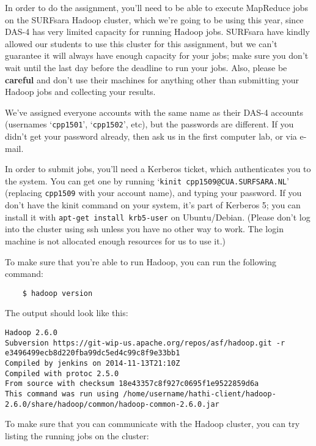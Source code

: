 \documentclass[a4paper,11pt]{article}
\begin{document}
  In order to do the assignment, you'll need to be able to execute MapReduce jobs on the SURFsara Hadoop cluster, which we're going to be using
  this year, since DAS-4 has very limited capacity for running Hadoop jobs. SURFsara have kindly allowed our students to use this cluster for this
  assignment, but we can't guarantee it will always have enough capacity for your jobs; make sure you don't wait until the last day before the
  deadline to run your jobs. Also, please be \textbf{careful} and don't use their machines for anything other than submitting your Hadoop jobs
  and collecting your results.

  We've assigned everyone accounts with the same name as their DAS-4 accounts (usernames `\texttt{cpp1501}', `\texttt{cpp1502}', etc), but the passwords
  are different. If you didn't get your password already, then ask us in the first computer lab, or via e-mail.

  In order to submit jobs, you'll need a Kerberos ticket, which authenticates you to the system. You can get one by running
  `\texttt{kinit cpp1509@CUA.SURFSARA.NL}' (replacing \texttt{cpp1509} with your account name), and typing your password. If you don't have the kinit
  command on your system, it's part of Kerberos 5; you can install it with \texttt{apt-get install krb5-user} on Ubuntu/Debian.
  (Please don't log into the cluster using ssh unless you have no other way to work. The login machine is not allocated enough resources
  for us to use it.)

  To make sure that you're able to run Hadoop, you can run the following command: 
  
  \lstset{language=}
  
  \begin{lstlisting}
    $ hadoop version
  \end{lstlisting}
  
  The output should look like this: 
  \begin{lstlisting}
Hadoop 2.6.0
Subversion https://git-wip-us.apache.org/repos/asf/hadoop.git -r e3496499ecb8d220fba99dc5ed4c99c8f9e33bb1
Compiled by jenkins on 2014-11-13T21:10Z
Compiled with protoc 2.5.0
From source with checksum 18e43357c8f927c0695f1e9522859d6a
This command was run using /home/username/hathi-client/hadoop-2.6.0/share/hadoop/common/hadoop-common-2.6.0.jar
  \end{lstlisting}

  To make sure that you can communicate with the Hadoop cluster, you can try listing the running jobs on the cluster:
\end{document}
